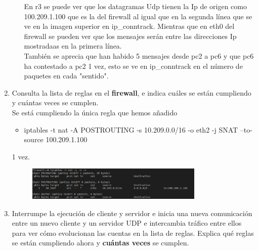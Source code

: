 \documentclass[12pt, a4paper]{report}
\begin{document}
\begin{enumerate}
\begin{enumerate}[a)]
		En r3 se puede ver que los datagramas Udp tienen la Ip de origen como 100.209.1.100 que es la del firewall al igual que en la segunda línea que se ve en la imagen superior en ip\_conntrack. Mientras que en eth0 del firewall se pueden ver que los mensajes serán entre las direcciones Ip mostradaas en la primera línea.\\
		También se aprecia que han habido 5 mensajes desde pc2 a pc6 y que pc6 ha contestado a pc2 1 vez, esto se ve en ip\_conntrack en el número de paquetes en cada "sentido".
	\end{enumerate}
	\item Consulta la lista de reglas en el \textbf{firewall}, e indica cuáles se están cumpliendo y cuántas veces
	se cumplen.\\
	
	Se está cumpliendo la única regla que hemos añadido
	\begin{center}
		\begin{itemize}
			\item iptables -t nat -A POSTROUTING -s 10.209.0.0/16 -o eth2 -j SNAT --to-source 100.209.1.100
		\end{itemize}
	\end{center}
	1 vez.
	\begin{figure}[h]
		\centering
		\includegraphics[width=0.8\textwidth]{ej2.1.2_2}
	\end{figure}
	\item Interrumpe la ejecución de cliente y servidor e inicia una nueva comunicación entre un nuevo
	cliente y un servidor UDP e intercambia tráfico entre ellos para ver cómo evolucionan las cuentas
	en la lista de reglas. Explica qué reglas se están cumpliendo ahora y \textbf{cuántas veces} se cumplen.\\
	

\end{enumerate}
\end{document}
